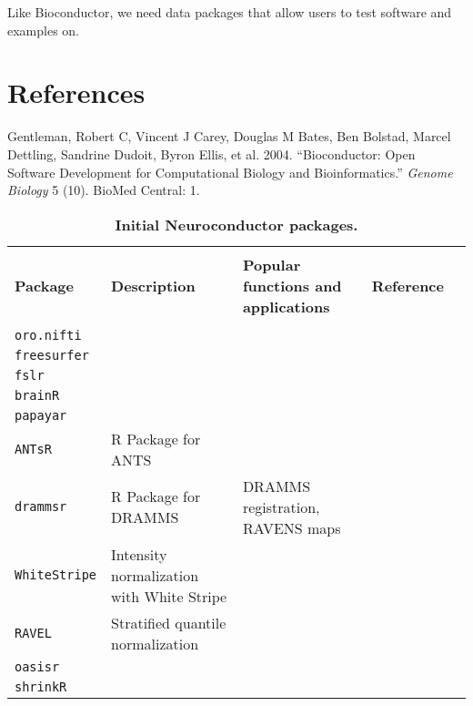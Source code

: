 \documentclass[]{elsarticle} %
\begin{document}
Like Bioconductor, we need data packages that allow users to test
software and examples on.

\section*{References}\label{references}

\hypertarget{refs}{}
\hypertarget{ref-gentleman2004bioconductor}{}
Gentleman, Robert C, Vincent J Carey, Douglas M Bates, Ben Bolstad,
Marcel Dettling, Sandrine Dudoit, Byron Ellis, et al. 2004.
``Bioconductor: Open Software Development for Computational Biology and
Bioinformatics.'' \emph{Genome Biology} 5 (10). BioMed Central: 1.

\begin{table}[!ht]
\footnotesize
\centering
\caption{\textbf{Initial Neuroconductor packages.}}\label{tab:summary}
\begin{tabular}{lllcl}
\hline \\[-2ex]
\textbf{Package} & \textbf{Description} & \textbf{Popular functions and applications} & \textbf{Reference} \\
\hline \\ [-1.5ex]
\texttt{oro.nifti} &  &  & &   \\ [1ex]
\texttt{freesurfer} & &  & \\ [1ex]
 \texttt{fslr} &  & &   \\ [1ex]
 \texttt{brainR} &  &  &    \\ [1ex]
 \texttt{papayar} &  &  &    \\ [1ex]
   \texttt{ANTsR} & R Package for ANTS &   \\ [1ex]
  \texttt{drammsr} & R Package for DRAMMS & 
  DRAMMS registration, RAVENS maps  \\ [1ex]
 \texttt{WhiteStripe} & Intensity normalization with White Stripe & & &   \\ [1ex]
   \texttt{RAVEL} & Stratified quantile normalization &&&  \\ [1ex]
     \texttt{oasisr} &  &&&  \\ [1ex]
     \texttt{shrinkR} &  &&&  \\ [1ex]
\hline
\end{tabular}
\end{table}
\end{document}

